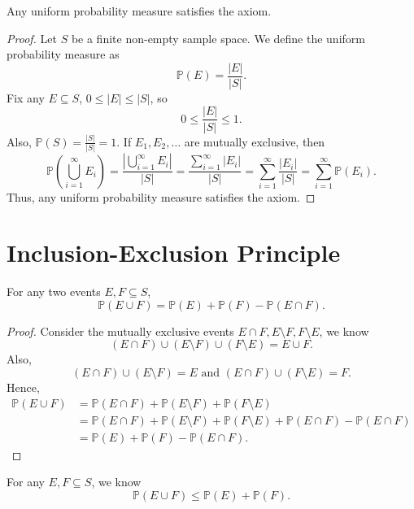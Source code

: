 \begin{eg}
    Any uniform probability measure satisfies the axiom.
\end{eg}
\begin{proof}
    Let \(S\) be a finite non-empty sample space. We define the uniform probability measure as 
    \[
        \mathbb{P} (E) = \frac{\vert E \vert }{\vert S \vert }.
    \]  
    Fix any \(E \subseteq S\), \(0 \le \vert E \vert \le \vert S \vert  \), so 
    \[
        0 \le \frac{\vert E \vert }{\vert S \vert } \le 1.
    \]
    Also, \(\mathbb{P} (S) = \frac{\vert S \vert }{\vert S \vert } = 1\). If \(E_1, E_2, \dots \) are mutually exclusive, then 
    \[
        \mathbb{P} \left( \bigcup_{i=1}^{\infty} E_i  \right) = \frac{\left\vert \bigcup_{i=1}^{\infty} E_i  \right\vert }{\vert S \vert } = \frac{\sum_{i=1}^{\infty} \vert E_i \vert  }{\vert S \vert } = \sum_{i=1}^{\infty} \frac{\vert E_i \vert }{\vert S \vert } = \sum_{i=1}^{\infty} \mathbb{P} (E_i).  
    \]  
    Thus, any uniform probability measure satisfies the axiom.
\end{proof}

\section{Inclusion-Exclusion Principle}

\begin{proposition}
    For any two events \(E, F \subseteq S\), 
    \[
        \mathbb{P} (E \cup F) = \mathbb{P} (E) + \mathbb{P} (F) - \mathbb{P} (E \cap F).
    \] 
\end{proposition}
\begin{proof}
    Consider the mutually exclusive events \(E \cap F, E \setminus F, F \setminus E\), we know 
    \[
        \left( E \cap F \right) \cup \left( E \setminus F \right) \cup \left( F \setminus E \right) = E \cup F.   
    \] 
    Also, 
    \[
        (E \cap F) \cup (E \setminus F) = E \text{ and } (E \cap F) \cup (F \setminus E) = F. 
    \]
    Hence, 
    \begin{align*}
        \mathbb{P} (E \cup F) &= \mathbb{P} (E \cap F) + \mathbb{P} (E \setminus F) + \mathbb{P} (F \setminus E) \\
        &= \mathbb{P} (E \cap F) + \mathbb{P} (E \setminus F) + \mathbb{P} (F \setminus E) + \mathbb{P} (E \cap F) - \mathbb{P} (E \cap F) \\
        &= \mathbb{P} (E) + \mathbb{P} (F) - \mathbb{P} (E \cap F).
    \end{align*}
\end{proof}

\begin{corollary}
    For any \(E, F \subseteq S\), we know 
    \[
        \mathbb{P} (E \cup F) \le \mathbb{P} (E) + \mathbb{P} (F).
    \] 
\end{corollary}